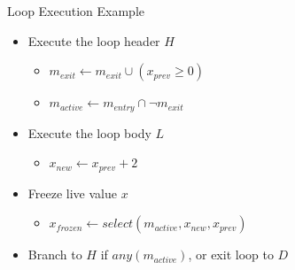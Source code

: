 \begin{frame}{Loop Execution Example}

\vspace{-1ex}
\begin{minipage}[t]{0.65\linewidth}
\begin{itemize}
    \item Execute the loop header $H$
    \begin{itemize}
        \item $m_{exit} \leftarrow m_{exit} \cup (x_{prev} \geq 0)$
        \item $m_{active} \leftarrow m_{entry} \cap \neg m_{exit}$
    \end{itemize}
    \item Execute the loop body $L$
    \begin{itemize}
        \item $x_{new} \leftarrow x_{prev}+2$
    \end{itemize}
    \item Freeze live value $x$
    \begin{itemize}
        \item $x_{frozen} \leftarrow select(m_{active}, x_{new}, x_{prev})$
    \end{itemize}
    \item Branch to $H$ if $any(m_{active})$, or exit loop to $D$
\end{itemize}
\end{minipage}\begin{minipage}[t]{0.32\linewidth}

\vspace{0.1ex}



\end{minipage}
\end{frame}
